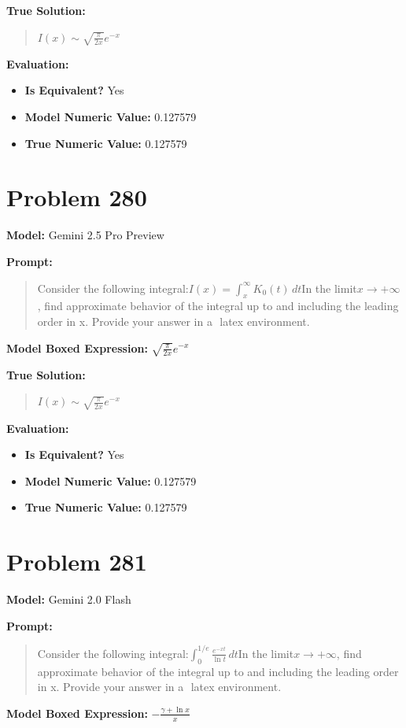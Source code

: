 \documentclass{article}
\begin{document}
{\textbf{True Solution:}
\begin{quote}
$I(x) \sim \sqrt{\frac{\pi}{2x}} e^{-x}$
\end{quote}

\textbf{Evaluation:}
\begin{itemize}
\item \textbf{Is Equivalent?} Yes
\item \textbf{Model Numeric Value:} 0.127579
\item \textbf{True Numeric Value:} 0.127579
\end{itemize}
\vspace{1cm}
\section*{Problem 280}
\textbf{Model:} Gemini 2.5 Pro Preview

\textbf{Prompt:}
\begin{quote}
Consider the following integral:$ I(x) = \int_{x}^{\infty} K_0(t) \, dt $In the limit$x \to +\infty$, find approximate behavior of the integral up to and including the leading order in x. Provide your answer in a $\boxed{}$ latex environment.
\end{quote}
\textbf{Model Boxed Expression:} $\sqrt{\frac{\pi}{2x}}e^{-x}$

\textbf{True Solution:}
\begin{quote}
$I(x) \sim \sqrt{\frac{\pi}{2x}} e^{-x}$
\end{quote}

\textbf{Evaluation:}
\begin{itemize}
\item \textbf{Is Equivalent?} Yes
\item \textbf{Model Numeric Value:} 0.127579
\item \textbf{True Numeric Value:} 0.127579
\end{itemize}
\vspace{1cm}
\section*{Problem 281}
\textbf{Model:} Gemini 2.0 Flash

\textbf{Prompt:}
\begin{quote}
Consider the following integral:$\int_{0}^{1/e} \frac{e^{-xt}}{\ln t} \, dt$In the limit$x \to +\infty$, find approximate behavior of the integral up to and including the leading order in x. Provide your answer in a $\boxed{}$ latex environment.
\end{quote}
\textbf{Model Boxed Expression:} $-\frac{\gamma + \ln x}{x}$

}
\end{document}
